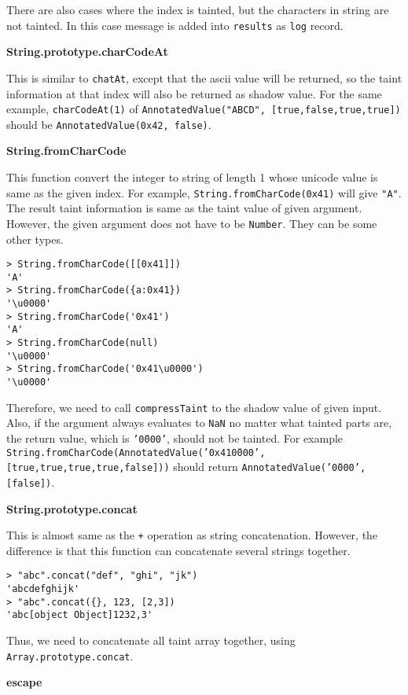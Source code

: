{There are also cases where the index is tainted, but the characters in string are not tainted. In this case message is added into \texttt{results} as \texttt{log} record.

\textbf{String.prototype.charCodeAt}

This is similar to \texttt{chatAt}, except that the ascii value will be returned, so the taint information at that index will also be returned as shadow value. For the same example, \texttt{charCodeAt(1)} of \texttt{AnnotatedValue("ABCD", [true,false,true,true])} should be \texttt{AnnotatedValue(0x42, false)}.

\textbf{String.fromCharCode}

This function convert the integer to string of length 1 whose unicode value is same as the given index. For example, \texttt{String.fromCharCode(0x41)} will give \texttt{"A"}. The result taint information is same as the taint value of given argument. However, the given argument does not have to be \texttt{Number}. They can be some other types.

\begin{verbatim}
> String.fromCharCode([[0x41]])
'A'
> String.fromCharCode({a:0x41})
'\u0000'
> String.fromCharCode('0x41')
'A'
> String.fromCharCode(null)
'\u0000'
> String.fromCharCode('0x41\u0000')
'\u0000'
\end{verbatim}

Therefore, we need to call \texttt{compressTaint} to the shadow value of given input. Also, if the argument always evaluates to \texttt{NaN} no matter what tainted parts are, the return value, which is \texttt{'\u0000'}, should not be tainted. For example \texttt{String.fromCharCode(AnnotatedValue('0x41\u0000', [true,true,true,true,false]))} should return \texttt{AnnotatedValue('\u0000', [false])}.

\textbf{String.prototype.concat}

This is almost same as the \texttt{+} operation as string concatenation. However, the difference is that this function can concatenate several strings together.

\begin{verbatim}
> "abc".concat("def", "ghi", "jk")
'abcdefghijk'
> "abc".concat({}, 123, [2,3])
'abc[object Object]1232,3'
\end{verbatim}

Thus, we need to concatenate all taint array together, using \texttt{Array.prototype.concat}.

\textbf{escape}

}
